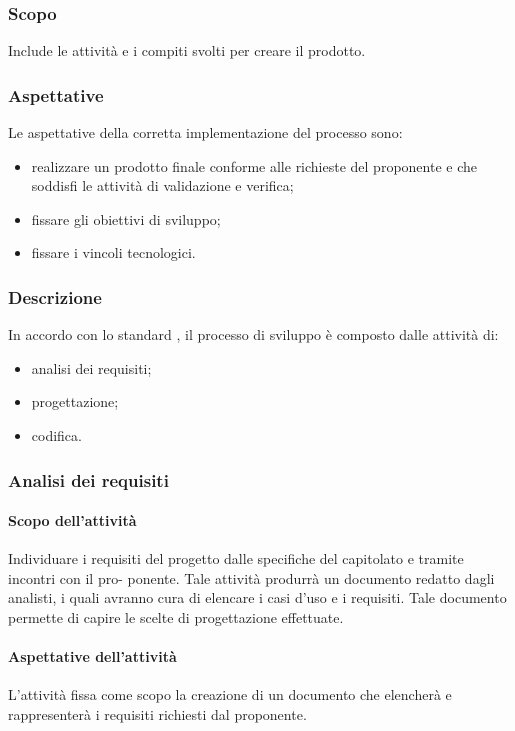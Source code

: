 \subsubsection{Scopo}
Include le attività e i compiti svolti per creare il prodotto.
\subsubsection{Aspettative}
Le aspettative della corretta implementazione del processo sono:
\begin{itemize}
		\item realizzare un prodotto finale conforme alle richieste del proponente e che soddisfi le attività di validazione e verifica;
		\item fissare gli obiettivi di sviluppo;
		\item fissare i vincoli tecnologici.
\end{itemize}

\subsubsection{Descrizione}
In accordo con lo standard , il processo di sviluppo è composto dalle attività di:
\begin{itemize}
		\item analisi dei requisiti;
		\item progettazione;
		\item codifica.
\end{itemize}

\subsubsection{Analisi dei requisiti}
 \paragraph{Scopo dell'attività}
  Individuare i requisiti del progetto dalle specifiche del capitolato e tramite incontri con il pro-
  ponente. Tale attività produrrà un documento redatto dagli analisti, i quali avranno cura di elencare i casi d'uso e i requisiti. Tale documento permette di
 capire le scelte di progettazione effettuate.
 \paragraph{Aspettative dell'attività}
 L'attività fissa come scopo la creazione di un documento che elencherà e rappresenterà i requisiti richiesti dal proponente.
